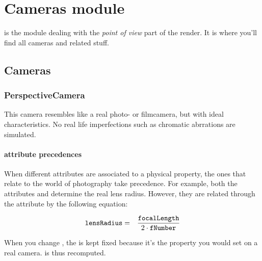 % 

\chapter{Cameras module}

 is the module dealing with the \emph{point of view} part of the render.  It is where you'll find all cameras and related stuff.

\section{Cameras}

\subsection{PerspectiveCamera}\label{cameras.PerspectiveCamera}

This camera resembles like a real photo- or filmcamera, but with ideal characteristics.  No real life imperfections such as chromatic abrrations are simulated.

\subsubsection*{attribute precedences}

When different attributes are associated to a physical property, the ones that relate to the world of photography take precedence.  For example, both the attributes  and  determine the real lens radius.  However, they are related through the  attribute by the following equation:

\begin{eqnarray}
	\kw{lensRadius} &=& \frac{\kw{focalLength}}{2 \cdot \kw{fNumber}}
\end{eqnarray}

When you change , the  is kept fixed because it's the property you would set on a real camera.   is thus recomputed.

